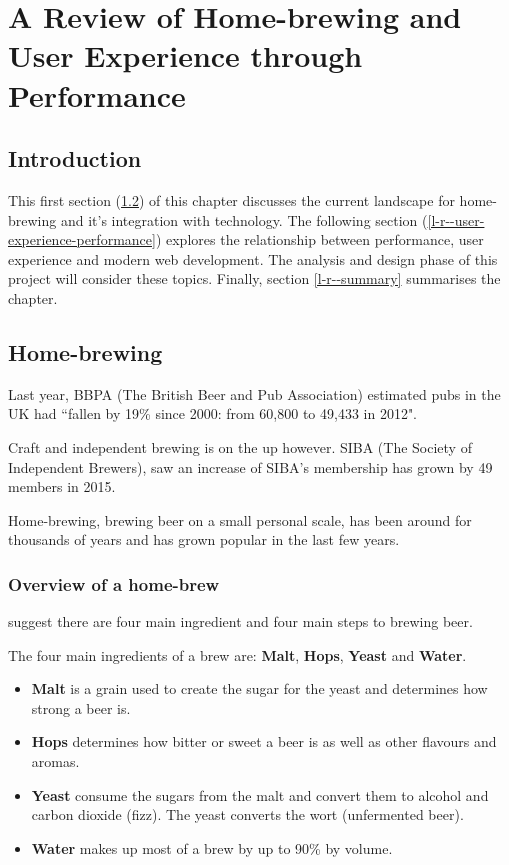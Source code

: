 \chapter{A Review of Home-brewing and User Experience through Performance} \label{l-r}

\section{Introduction} \label{l-r--introduction}

This first section (\ref{l-r--home-brewing}) of this chapter discusses the current landscape for home-brewing and it's integration with technology. The following section (\ref{l-r--user-experience-performance}) explores the relationship between performance, user experience and modern web development. The analysis and design phase of this project will consider these topics. Finally, section \ref{l-r--summary} summarises the chapter.

\section{Home-brewing} \label{l-r--home-brewing}

Last year, BBPA (The British Beer and Pub Association) estimated pubs in the UK had ``fallen by 19\% since 2000: from 60,800 to 49,433 in 2012". \cite{BBPA}

Craft and independent brewing is on the up however. SIBA (The Society of Independent Brewers), saw an increase of  SIBA’s membership has grown by 49 members in 2015. \cite{SIBA}

Home-brewing, brewing beer on a small personal scale, has been around for thousands of years and has grown popular in the last few years.

\subsection{Overview of a home-brew}

\cite{brewing_overview} suggest there are four main ingredient and four main steps to brewing beer.

The four main ingredients of a brew are: \textbf{Malt}, \textbf{Hops}, \textbf{Yeast} and \textbf{Water}.

\begin{itemize}
  \item \textbf{Malt} is a grain used to create the sugar for the yeast and determines how strong a beer is.
  \item \textbf{Hops} determines how bitter or sweet a beer is as well as other flavours and aromas.
  \item \textbf{Yeast} consume the sugars from the malt and convert them to alcohol and carbon dioxide (fizz). The yeast converts the wort (unfermented beer).
  \item \textbf{Water} makes up most of a brew by up to 90\% by volume.
\end{itemize}

